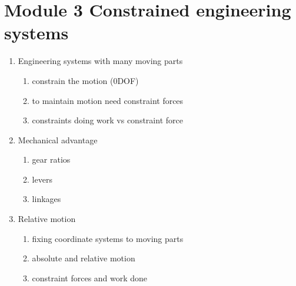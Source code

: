 \documentclass[letterpaper,10pt,english]{sphinxmanual}
\begin{document}
\chapter{Module 3 \sphinxhyphen{} Constrained engineering systems}
\label{\detokenize{module_03/overview:module-3-constrained-engineering-systems}}\label{\detokenize{module_03/overview::doc}}
\begin{enumerate}
%
\item {} 
Engineering systems with many moving parts
\begin{enumerate}
%
\item {} 
constrain the motion (0\sphinxhyphen{}DOF)

\item {} 
to maintain motion need constraint forces

\item {} 
constraints doing work vs constraint force

\end{enumerate}

\item {} 
Mechanical advantage
\begin{enumerate}
%
\item {} 
gear ratios

\item {} 
levers

\item {} 
linkages

\end{enumerate}

\item {} 
Relative motion
\begin{enumerate}
%
\item {} 
fixing coordinate systems to moving parts

\item {} 
absolute and relative motion

\item {} 
constraint forces and work done

\end{enumerate}

\end{enumerate}

\begin{sphinxVerbatim}[commandchars=\\\{\}]
   
   
   
  
\end{sphinxVerbatim}
\end{document}
